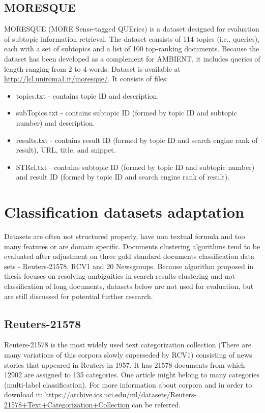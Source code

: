 \documentclass[a4paper, 12pt, oneside]{Thesis} %
\begin{document}
\subsection{MORESQUE} MORESQUE (MORE Sense-tagged QUEries) is a dataset designed for evaluation of subtopic information retrieval. The dataset consists of 114 topics (i.e., queries), each with a set of subtopics and a list of 100 top-ranking documents. Because the dataset has been developed as a complement for AMBIENT, it includes queries of length ranging from 2 to 4 words. Dataset is available at \url{http://lcl.uniroma1.it/moresque/}. It consists of files:
\begin{itemize}
\item topics.txt - contains topic ID and description.
\item subTopics.txt - contains subtopic ID (formed by topic ID and subtopic number) and description.
\item results.txt - contains result ID (formed by topic ID and search engine rank of result), URL,  title, and snippet.
\item STRel.txt - contains subtopic ID (formed by topic ID and subtopic number) and result ID (formed by topic ID and search engine rank of result).
\end{itemize}

\section{Classification datasets adaptation} Datasets are often not structured properly, have non textual formula and too many features or are domain specific. Documents clustering algorithms tend to be evaluated after adjustment on three gold standard documents classification data sets - Reuters-21578, RCV1 and 20 Newsgroups. Because algorithm proposed in thesis focuses on resolving ambiguities in search results clustering and not classification of long documents, datasets below are not used for evaluation, but are still discussed for potential further research.

\subsection{Reuters-21578} Reuters-21578 is the most widely used text categorization collection (There are many variations of this corpora slowly superseded by RCV1) consisting of news stories that appeared in Reuters in 1957. It has 21578 documents from which 12902 are assigned to 135 categories. One article might belong to many categories (multi-label classification). For more information about corpora and in order to download it: \url{https://archive.ics.uci.edu/ml/datasets/Reuters-21578+Text+Categorization+Collection} can be referred.
\end{document}
